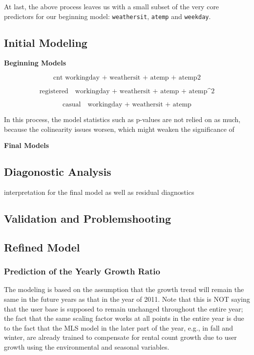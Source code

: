 \documentclass[
  twocolumn]{article}
\begin{document}
At last, the above process leaves us with a small subset of the very
core predictors for our beginning model: \texttt{weathersit},
\texttt{atemp} and \texttt{weekday}.

\hypertarget{initial-modeling}{%
\subsection{Initial Modeling}\label{initial-modeling}}

\textbf{Beginning Models}

\[\text{cnt \~ workingday + weathersit + atemp + atemp\^{2}}\]

\[ \text{registered ~ workingday + weathersit + atemp + atemp^2}\]

\[ \text{casual ~ workingday + weathersit + atemp}\]

In this process, the model statistics such as p-values are not relied on
as much, because the colinearity issues worsen, which might weaken the
significance of

\textbf{Final Models}

\hypertarget{diagonostic-analysis}{%
\subsection{Diagonostic Analysis}\label{diagonostic-analysis}}

interpretation for the final model as well as residual diagnostics

\hypertarget{validation-and-problemshooting}{%
\subsection{Validation and
Problemshooting}\label{validation-and-problemshooting}}

\hypertarget{refined-model}{%
\subsection{Refined Model}\label{refined-model}}

\hypertarget{prediction-of-the-yearly-growth-ratio}{%
\subsubsection{Prediction of the Yearly Growth
Ratio}\label{prediction-of-the-yearly-growth-ratio}}

The modeling is based on the assumption that the growth trend will
remain the same in the future years as that in the year of 2011. Note
that this is NOT saying that the user base is supposed to remain
unchanged throughout the entire year; the fact that the same scaling
factor works at all points in the entire year is due to the fact that
the MLS model in the later part of the year, e.g., in fall and winter,
are already trained to compensate for rental count growth due to user
growth using the environmental and seasonal variables.
\end{document}
